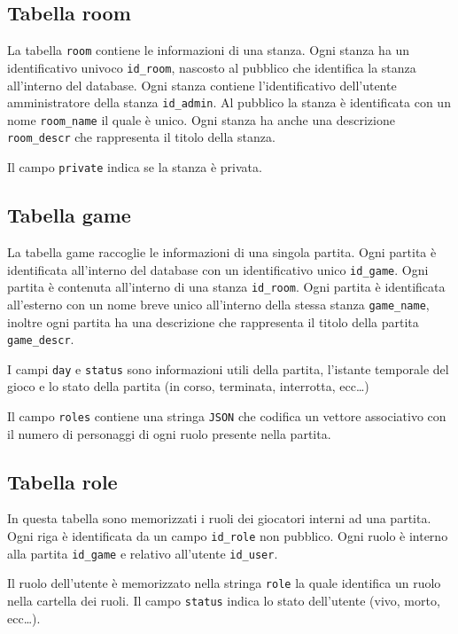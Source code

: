 \documentclass[10pt,a4paper]{article}
\begin{document}
\subsection{Tabella room}
La tabella \texttt{room} contiene le informazioni di una stanza. Ogni stanza ha un identificativo univoco \texttt{id\_room}, nascosto al pubblico che identifica la stanza all'interno del database. Ogni stanza contiene l'identificativo dell'utente amministratore della stanza \texttt{id\_admin}. Al pubblico la stanza è identificata con un nome \texttt{room\_name} il quale è unico. Ogni stanza ha anche una descrizione \texttt{room\_descr} che rappresenta il titolo della stanza. 

Il campo \texttt{private} indica se la stanza è privata.

\subsection{Tabella game}
La tabella game raccoglie le informazioni di una singola partita. Ogni partita è identificata all'interno del database con un identificativo unico \texttt{id\_game}. Ogni partita è contenuta all'interno di una stanza \texttt{id\_room}. Ogni partita è identificata all'esterno con un nome breve unico all'interno della stessa stanza \texttt{game\_name}, inoltre ogni partita ha una descrizione che rappresenta il titolo della partita \texttt{game\_descr}.

I campi \texttt{day} e \texttt{status} sono informazioni utili della partita, l'istante temporale del gioco e lo stato della partita (in corso, terminata, interrotta, ecc\dots)

Il campo \texttt{roles} contiene una stringa \texttt{JSON} che codifica un vettore associativo con il numero di personaggi di ogni ruolo presente nella partita.

\subsection{Tabella role}
In questa tabella sono memorizzati i ruoli dei giocatori interni ad una partita. Ogni riga è identificata da un campo \texttt{id\_role} non pubblico. Ogni ruolo è interno alla partita \texttt{id\_game} e relativo all'utente \texttt{id\_user}. 

Il ruolo dell'utente è memorizzato nella stringa \texttt{role} la quale identifica un ruolo nella cartella dei ruoli. Il campo \texttt{status} indica lo stato dell'utente (vivo, morto, ecc\dots). 
\end{document}
